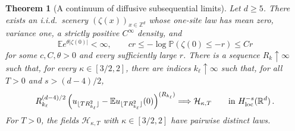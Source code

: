 \documentclass[11pt]{amsart}
\theoremstyle{plain}
\newtheorem{theorem}{Theorem}[section]
\theoremstyle{definition}
\newcommand{\Z}{\mathbb{Z}}
\newcommand{\R}{\mathbb{R}}
\newcommand{\E}{\mathbb{E}}
\renewcommand{\P}{\mathbb{P}}
\begin{document}
\begin{theorem}[A continuum of diffusive subsequential limits]
\label{thm:dgt4-many-limits}
	Let $d\geq5$. There exists an i.i.d.\ scenery
	$(\zeta(x))_{x\in\Z^d}$ whose one-site law has mean zero, variance one,
	a strictly positive
	$C^\infty$ density, and
	\[
		\E e^{\theta|\zeta(0)|}<\infty,
		\qquad
		cr\leq-\log\P(\zeta(0)\leq-r)\leq Cr
	\]
	for some $c,C,\theta>0$ and every sufficiently large $r$.
	There is a sequence $R_k\uparrow\infty$ such that, for every
	$\kappa\in[3/2,2]$, there are indices
	$k_\ell\uparrow\infty$ such that, for all $T>0$ and
	$s>(d-4)/2$,
	\[
		R_{k_\ell}^{(d-4)/2}
		\left(
		u_{\lfloor TR_{k_\ell}^2\rfloor}
		-\E u_{\lfloor TR_{k_\ell}^2\rfloor}(0)
		\right)^{(R_{k_\ell})}
		\Longrightarrow
		\mathcal H_{\kappa,T}
		\qquad\text{in }H^{-s}_{\rm loc}(\R^d)\, .
	\]
	For $T>0$, the fields $\mathcal H_{\kappa,T}$ with
	$\kappa\in[3/2,2]$ have pairwise distinct laws.
\end{theorem}
\end{document}
